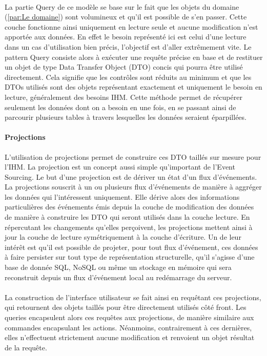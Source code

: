 \paragraph{}
La partie Query de ce modèle se base sur le fait que les objets du domaine (\ref{par:Le domaine}) sont volumineux et qu'il est possible de s'en passer.
Cette couche fonctionne ainsi uniquement en lecture seule et aucune modification n'est apportée aux données.
En effet le besoin représenté ici est celui d'une lecture dans un cas d'utilisation bien précis, l'objectif est d'aller extrêmement vite.
Le pattern Query consiste alors à exécuter une requête précise en base et de restituer un objet de type Data Transfer Object (DTO) concis qui pourra être utilisé directement.
Cela signifie que les contrôles sont réduits au minimum et que les DTOs utilisés sont des objets représentant exactement et uniquement le besoin en lecture, généralement des besoins IHM.
Cette méthode permet de récupérer seulement les données dont on a besoin en une fois, en se passant ainsi de parcourir plusieurs tables à travers lesquelles les données seraient éparpillées.
\paragraph{Projections}
L'utilisation de projections permet de construire ces DTO taillés sur mesure pour l'IHM.
La projection est un concept aussi simple qu'important de l'Event Sourcing.
Le but d'une projection est de dériver un état d'un flux d'événements.
La projections souscrit à un ou plusieurs flux d'événements de manière à aggréger les données qui l'intéressent uniquement.
Elle dérive alors des informations particulières des événements émis depuis la couche de modification des données de manière à construire les DTO qui seront utilisés dans la couche lecture.
En répercutant les changements qu'elles perçoivent, les projections mettent ainsi à jour la couche de lecture symétriquement à la couche d'écriture.
Un de leur intérêt est qu'il est possible de projeter, pour tout flux d'événement, ces données à faire persister sur tout type de représentation structurelle, qu'il s'agisse d'une base de donnée SQL, NoSQL ou même un stockage en mémoire qui sera reconstruit depuis un flux d'événement local au redémarrage du serveur.
\paragraph{}
La construction de l'interface utilisateur se fait ainsi en requêtant ces projections, qui retournent des objets taillés pour être directement utilisés côté front.
Les queries encapsulent alors ces requêtes aux projections, de manière similaire aux commandes encapsulant les actions.
Néanmoins, contrairement à ces dernières, elles n'effectuent strictement aucune modification et renvoient un objet résultat de la requête.
